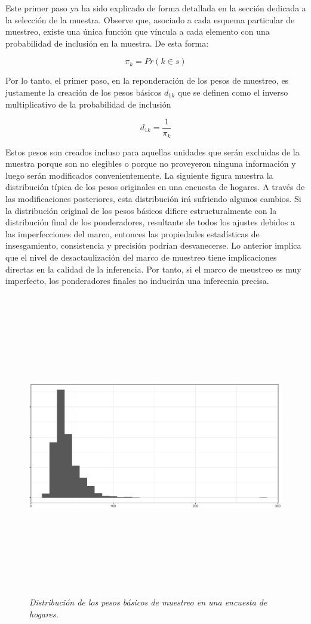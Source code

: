 \documentclass[
  12pt,
  spanish,
]{book}
\begin{document}
Este primer paso ya ha sido explicado de forma detallada en la sección dedicada a la selección de la muestra. Observe que, asociado a cada esquema particular de muestreo, existe una única función que víncula a cada elemento con una probabilidad de inclusión en la muestra. De esta forma:

\[\pi_k = Pr (k \in s)\]

Por lo tanto, el primer paso, en la reponderación de los pesos de muestreo, es justamente la creación de los pesos básicos \(d_{1k}\) que se definen como el inverso multiplicativo de la probabilidad de inclusión

\[d_{1k} = \frac{1}{\pi_k}\]

Estos pesos son creados incluso para aquellas unidades que serán excluidas de la muestra porque son no elegibles o porque no proveyeron ninguna información y luego serán modificados convenientemente. La siguiente figura muestra la distribución típica de los pesos originales en una encuesta de hogares. A través de las modificaciones posteriores, esta distribución irá sufriendo algunos cambios. Si la distribución original de los pesos básicos difiere estructuralmente con la distribución final de los ponderadores, resultante de todos los ajustes debidos a las imperfecciones del marco, entonces las propiedades estadísticas de insesgamiento, consistencia y precisión podrían desvanecerse. Lo anterior implica que el nivel de desactaulización del marco de muestreo tiene implicaciones directas en la calidad de la inferencia. Por tanto, si el marco de meustreo es muy imperfecto, los ponderadores finales no inducirán una inferecnia precisa.

\begin{figure}
\centering
\includegraphics[width=\textwidth,height=5.20833in]{Pics/15.png}
\caption{\emph{Distribución de los pesos básicos de muestreo en una encuesta de hogares.}}
\end{figure}
\end{document}
